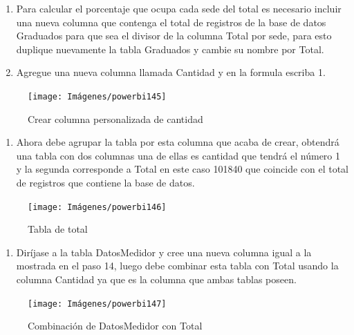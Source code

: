 \documentclass[
]{book}
\providecommand{\tightlist}{%
  \setlength{\itemsep}{0pt}\setlength{\parskip}{0pt}}
\begin{document}
\begin{enumerate}
\def\labelenumi{\arabic{enumi}.}
\setcounter{enumi}{12}
\item
  Para calcular el porcentaje que ocupa cada sede del total es necesario incluir una nueva columna que contenga el total de registros de la base de datos Graduados para que sea el divisor de la columna Total por sede, para esto duplique nuevamente la tabla Graduados y cambie su nombre por Total.
\item
  Agregue una nueva columna llamada Cantidad y en la formula escriba 1.
\end{enumerate}

\begin{figure}

{\centering \texttt{[image: Imágenes/powerbi145]} 

}

\caption{Crear columna personalizada de cantidad}\label{fig:crearcolumnacantidadentotal-fig}
\end{figure}

\begin{enumerate}
\def\labelenumi{\arabic{enumi}.}
\setcounter{enumi}{14}
\tightlist
\item
  Ahora debe agrupar la tabla por esta columna que acaba de crear, obtendrá una tabla con dos columnas una de ellas es cantidad que tendrá el número 1 y la segunda corresponde a Total en este caso 101840 que coincide con el total de registros que contiene la base de datos.
\end{enumerate}

\begin{figure}

{\centering \texttt{[image: Imágenes/powerbi146]} 

}

\caption{Tabla de total}\label{fig:tabladetotal-fig}
\end{figure}

\begin{enumerate}
\def\labelenumi{\arabic{enumi}.}
\setcounter{enumi}{15}
\tightlist
\item
  Diríjase a la tabla DatosMedidor y cree una nueva columna igual a la mostrada en el paso 14, luego debe combinar esta tabla con Total usando la columna Cantidad ya que es la columna que ambas tablas poseen.
\end{enumerate}

\begin{figure}

{\centering \texttt{[image: Imágenes/powerbi147]} 

}

\caption{Combinación de DatosMedidor con Total}\label{fig:combinardatoscontotal-fig}
\end{figure}
\end{document}
